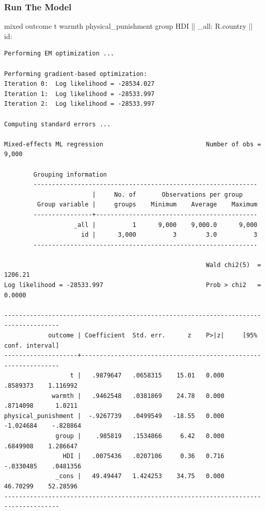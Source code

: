 \documentclass[
  letterpaper,
  DIV=11,
  numbers=noendperiod,
  oneside]{scrreprt}
\newenvironment{Shaded}{\begin{snugshade}}{\end{snugshade}}
\newcommand{\DataTypeTok}[1]{\textcolor[rgb]{0.68,0.00,0.00}{#1}}
\newcommand{\FunctionTok}[1]{\textcolor[rgb]{0.28,0.35,0.67}{#1}}
\newcommand{\NormalTok}[1]{\textcolor[rgb]{0.00,0.23,0.31}{#1}}
\begin{document}
\hypertarget{run-the-model-3}{%
\subsubsection{Run The Model}\label{run-the-model-3}}

\begin{Shaded}
\begin{Highlighting}[]

\NormalTok{mixed outcome t warmth physical\_punishment }\FunctionTok{group}\NormalTok{ HDI || }\DataTypeTok{\_all}\NormalTok{: R.country || id:}
\end{Highlighting}
\end{Shaded}

\begin{verbatim}
Performing EM optimization ...

Performing gradient-based optimization: 
Iteration 0:  Log likelihood = -28534.027  
Iteration 1:  Log likelihood = -28533.997  
Iteration 2:  Log likelihood = -28533.997  

Computing standard errors ...

Mixed-effects ML regression                            Number of obs =   9,000

        Grouping information
        -------------------------------------------------------------
                        |     No. of       Observations per group
         Group variable |     groups    Minimum    Average    Maximum
        ----------------+--------------------------------------------
                   _all |          1      9,000    9,000.0      9,000
                     id |      3,000          3        3.0          3
        -------------------------------------------------------------

                                                       Wald chi2(5)  = 1206.21
Log likelihood = -28533.997                            Prob > chi2   =  0.0000

-------------------------------------------------------------------------------------
            outcome | Coefficient  Std. err.      z    P>|z|     [95% conf. interval]
--------------------+----------------------------------------------------------------
                  t |   .9879647   .0658315    15.01   0.000     .8589373    1.116992
             warmth |   .9462548   .0381869    24.78   0.000     .8714098      1.0211
physical_punishment |  -.9267739   .0499549   -18.55   0.000    -1.024684    -.828864
              group |    .985819   .1534866     6.42   0.000     .6849908    1.286647
                HDI |   .0075436   .0207106     0.36   0.716    -.0330485    .0481356
              _cons |   49.49447   1.424253    34.75   0.000     46.70299    52.28596
-------------------------------------------------------------------------------------


\end{verbatim}
\end{document}
